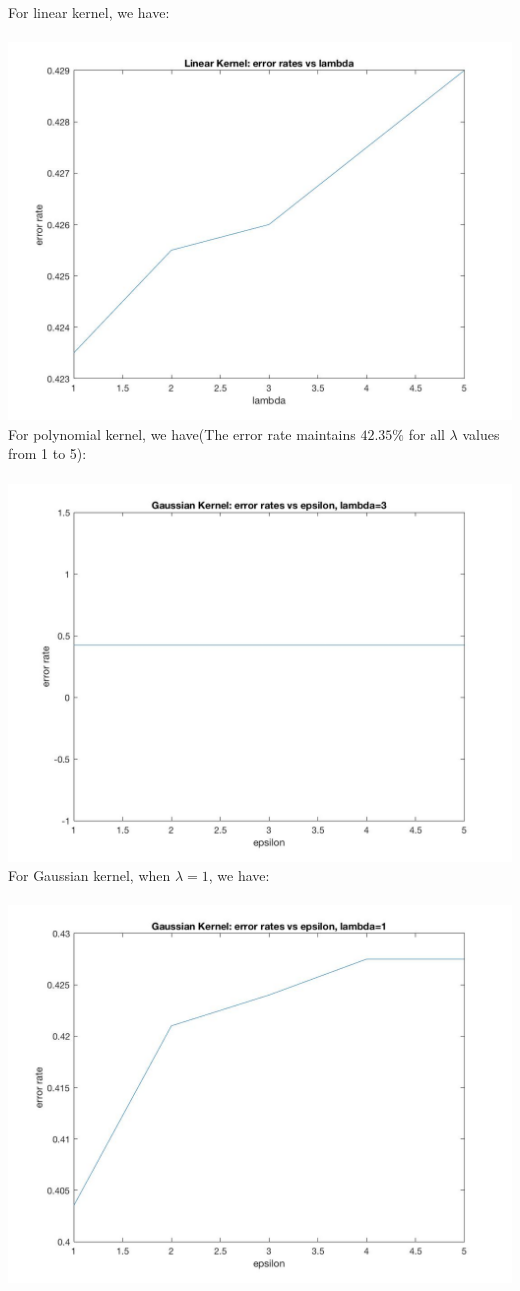 \documentclass[11pt]{article} %
\begin{document}
For linear kernel, we have:\\\\
\includegraphics[scale = 0.4]{e14linear.jpg}
For polynomial kernel, we have(The error rate maintains $42.35\%$ for all $\lambda$ values from 1 to 5):\\\\
\includegraphics[scale = 0.4]{e14polynomial.jpg}
For Gaussian kernel, when $\lambda = 1$, we have:\\\\
\includegraphics[scale = 0.4]{e14gaussianlambda1.jpg}
\end{document}
